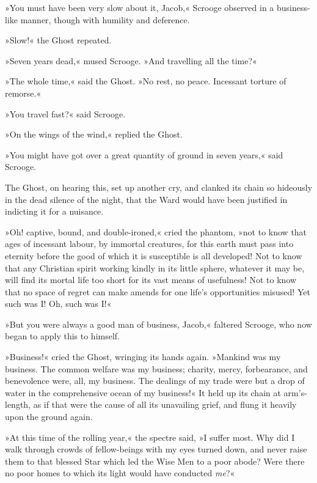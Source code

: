»You must have been very slow about it, Jacob,« Scrooge observed in a business-like manner, though with humility and deference.

»Slow!« the Ghost repeated.

»Seven years dead,« mused Scrooge. »And travelling all the time?«

»The whole time,« said the Ghost. »No rest, no peace. Incessant torture of remorse.«

»You travel fast?« said Scrooge.

»On the wings of the wind,« replied the Ghost. 

»You might have got over a great quantity of ground in seven years,« said Scrooge.



The Ghost, on hearing this, set up another cry, and clanked its chain so hideously in the dead silence of the night, that the Ward would have been justified in indicting it for a nuisance.



»Oh! captive, bound, and double-ironed,« cried the phantom, »not to know that ages of incessant labour, by immortal creatures, for this earth must pass into eternity before the good of which it is susceptible is all developed! Not to know that any Christian spirit working kindly in its little sphere, whatever it may be, will find its mortal life too short for its vast means of usefulness! Not to know that no space of regret can make amends for one life's opportunities misused! Yet such was I\@! Oh, such was I\@!«



»But you were always a good man of business, Jacob,« faltered Scrooge, who now began to apply this to himself.

»Business!« cried the Ghost, wringing its hands again. »Mankind was my business. The common welfare was my business; charity, mercy, forbearance, and benevolence were, all, my business. The dealings of my trade were but a drop of water in the comprehensive ocean of my business!«
It held up its chain at arm's-length, as if that were the cause of all its unavailing grief, and flung it heavily upon the ground again.

»At this time of the rolling year,« the spectre said, »I suffer most. Why did I walk through crowds of fellow-beings with my eyes turned down, and never raise them to that blessed Star which led the Wise Men to a poor abode? Were there no poor homes to which its light would have conducted \textit{me}?«

